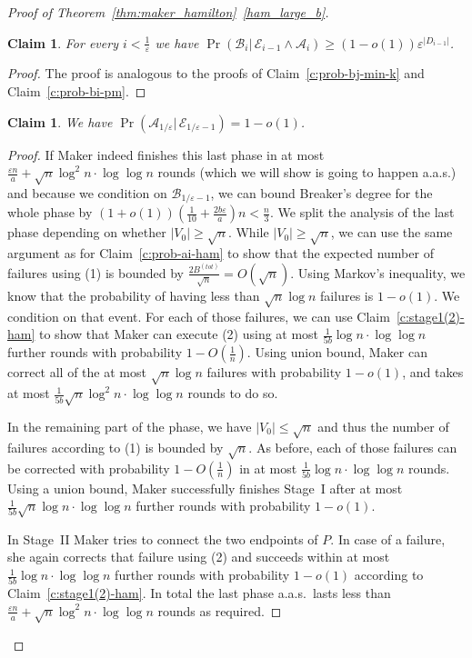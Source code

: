 \documentclass[11pt, a4paper]{article}
\numberwithin{equation}{section}
\numberwithin{figure}{section}
\newtheorem{claim}[theorem]{Claim}
\newcommand{\eps}{\varepsilon}
\begin{document}
\begin{proof}[Proof of Theorem~\ref{thm:maker_hamilton}~\ref{ham_large_b}]
\begin{claim} \label{c:prob-bi-ham}
For every $i<\frac{1}{\eps}$ we have $\operatorname{Pr}(\mathcal{B}_i|\, \mathcal{E}_{i-1} \land \mathcal{A}_i) \geq (1-o(1)) \varepsilon^{|D_{i-1}|}$.
\end{claim}

\begin{proof}
The proof is analogous to the proofs of
Claim~\ref{c:prob-bj-min-k} and Claim~\ref{c:prob-bi-pm}.
\end{proof}

\begin{claim} \label{c:prob-last-ai-ham}
We have $\operatorname{Pr}(\mathcal{A}_{1/\eps}|\, \mathcal{E}_{1/\eps-1}) = 1-o(1)$.
\end{claim}

\begin{proof}
If Maker indeed finishes this last phase in at most 
$\frac{\eps n}{a} + \sqrt{n}\log^2 n \cdot \log\log n$ rounds (which we will show is going to happen a.a.s.) and because we condition on $\mathcal{B}_{1/\eps - 1}$, we can bound Breaker's degree for the whole phase by $(1+o(1))(\frac{1}{10} + \frac{2b\eps}{a}) n < \frac{n}{3}$. We split the analysis of the last phase depending on whether $|V_0| \geq \sqrt{n}$. While $|V_0| \geq \sqrt{n}$, we can use the same argument as for Claim~\ref{c:prob-ai-ham} to show that the expected number of failures using (1) is bounded by $\frac{2B^{(tot)}}{\sqrt{n}} = O(\sqrt{n})$. Using Markov's inequality, we know that the probability of having less than $\sqrt{n}\log n$ failures is $1 - o(1)$. We condition on that event. For each of those failures, we can use Claim~\ref{c:stage1(2)-ham} to show that Maker can execute (2) using at most $\frac{1}{5b}\log n\cdot \log\log n$ further rounds with probability $1 - O(\frac{1}{n})$. Using union bound, Maker can correct all of the at most $\sqrt{n}\log n$ failures with probability $1 - o(1)$, and takes at most $\frac{1}{5b}\sqrt{n}\log^2 n \cdot \log\log n$ rounds to do so.

In the remaining part of the phase, we have $|V_0| \leq \sqrt{n}$ and thus the number of failures according to (1) is bounded by $\sqrt{n}$. As before, each of those failures can be corrected with probability $1 - O(\frac{1}{n})$ in at most $\frac{1}{5b}\log n\cdot \log\log n$ rounds. Using a union bound, Maker successfully finishes Stage~I after at most $\frac{1}{5b}\sqrt{n}\log n\cdot \log\log n$ further rounds with probability $1 - o(1)$.

In Stage~II Maker tries to connect the two endpoints of $P$. In case of a failure, she again corrects that failure using (2) and succeeds within at most $\frac{1}{5b}\log n\cdot \log\log n$ further rounds with probability $1 - o(1)$ according to Claim~\ref{c:stage1(2)-ham}. In total the last phase a.a.s.~lasts less than $\frac{\eps n}{a} + \sqrt{n}\log^2 n \cdot \log\log n$ rounds as required.
\end{proof}


\end{proof}
\end{document}
